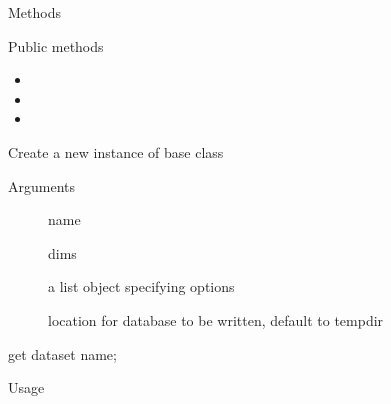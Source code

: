 \documentclass[letterpaper]{book}
\begin{document}
\begin{Section}{Methods}
%
\begin{SubSection}{Public methods}
\begin{itemize}

\item{} 
\item{} 
\item{} 

\end{itemize}

\end{SubSection}



\hypertarget{method-analysisBase-initialize}{}
%
\begin{SubSection}{}
Create a new instance of base class
%

%
\begin{SubSubSection}{Arguments}

\begin{description}

\item[] name
\item[] dims
\item[] a list object specifying options
\item[] location for database to be written, default to tempdir

\end{description}



\end{SubSubSection}

\end{SubSection}




\hypertarget{method-analysisBase-name}{}
%
\begin{SubSection}{}
get dataset name;
%
\begin{SubSubSection}{Usage}


\end{SubSubSection}
\end{SubSection}
\end{Section}
\end{document}

